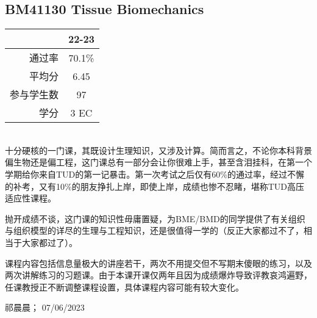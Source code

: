 \subsection{BM41130 Tissue Biomechanics}
\begin{minipage}{0.45\textwidth}
\centering
{}
\end{minipage}%
\begin{minipage}{0.45\textwidth}
\raggedleft
\begin{tabular}{r|c}
\textbf{ } & \textbf{22-23} \\ \hline
通过率 & 70.1\% \\ 
平均分 & 6.45 \\ 
参与学生数 & 97 \\
学分 & 3 EC\\
\end{tabular}
\end{minipage}\\

十分硬核的一门课，其既设计生理知识，又涉及计算。简而言之，不论你本科背景偏生物还是偏工程，这门课总有一部分会让你很难上手，甚至含泪挂科，在第一个学期给你来自TUD的第一记暴击。第一次考试之后仅有60\%的通过率，经过不懈的补考，又有10\%的朋友挣扎上岸，即使上岸，成绩也惨不忍睹，堪称TUD高压适应性课程。

抛开成绩不谈，这门课的知识性毋庸置疑，为BME/BMD的同学提供了有关组织与组织模型的详尽的生理与工程知识，还是很值得一学的（反正大家都过不了，相当于大家都过了）。

课程内容包括信息量极大的讲座若干，两次不用提交但不写期末傻眼的练习，以及两次讲解练习的习题课。由于本课开课仅两年且因为成绩爆炸导致评教哀鸿遍野，任课教授正不断调整课程设置，具体课程内容可能有较大变化。
\begin{flushright}
祁晨晨； 07/06/2023
\end{flushright}